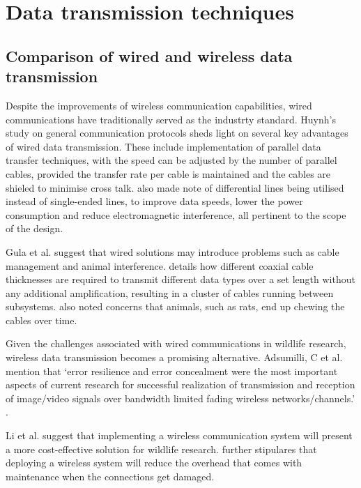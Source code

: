\documentclass[class=report,11pt,crop=false]{standalone}
\begin{document}
\section{Data transmission techniques}

\subsection{Comparison of wired and wireless data transmission}

Despite the improvements of wireless communication capabilities, wired communications have traditionally served as the industrty standard. Huynh’s study on general communication protocols \cite{huynh2010study} sheds light on several key advantages of wired data transmission. These include implementation of parallel data transfer techniques, with the speed can be adjusted by the number of parallel cables, provided the transfer rate per cable is maintained and the cables are shieled to minimise cross talk. \cite{huynh2010study} also made note of differential lines being utilised instead of single-ended lines, to improve data speeds, lower the power consumption and reduce electromagnetic interference, all pertinent to the scope of the design.

Gula et al. suggest that wired solutions may introduce problems such as cable management and animal interference. \cite{gula2010audio} details how different coaxial cable thicknesses are required to transmit different data types over a set length without any additional amplification, resulting in a cluster of cables running between subsystems. \cite{gula2010audio} also noted concerns that animals, such as rats, end up chewing the cables over time. 

Given the challenges associated with wired communications in wildlife research, wireless data transmission becomes a promising alternative. Adsumilli, C et al.  mention that ‘error resilience and error concealment were the most important aspects of current research for successful realization of transmission and reception of image/video signals over bandwidth limited fading wireless networks/channels.’ \cite{adsumilli2002adaptive}. %

Li et al. \cite{li2010design} suggest that implementing a wireless communication system will present a more cost-effective solution for wildlife research.  \cite{li2010design} further stipulares that deploying a wireless system will reduce the overhead that comes with maintenance when the connections get damaged.
\end{document}
